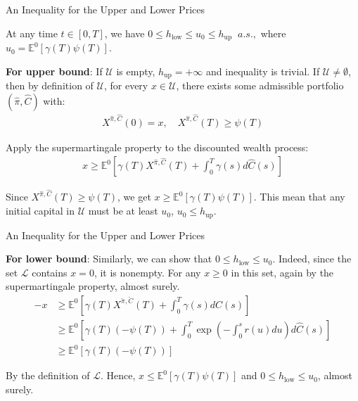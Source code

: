 \documentclass{beamer}
\begin{document}
\begin{frame}{An Inequality for the Upper and Lower Prices}

    {\footnotesize \footnotesize
    \par At any time $t \in [0, T]$, we have $ 0 \leq h_{\text{low}} \leq u_0 \leq h_{\text{up}}\;\; a.s.,$ where $u_0 = \mathbb{E}^0[\gamma(T)\psi(T)]$.
    \vspace{1em}
    \par \textbf{For upper bound}: If $\mathcal{U}$ is empty, $h_{\text{up}} = +\infty$ and inequality is trivial. If $\mathcal{U} \neq \emptyset$, then by definition of $\mathcal{U}$, for every $x \in \mathcal{U}$,
     there exists some admissible portfolio $(\hat{\pi}, \hat{C})$ with:
     \begin{align*}
        X^{\hat{\pi}, \hat{C}}(0) = x, \quad X^{\hat{\pi}, \hat{C}}(T) \geq \psi(T)
     \end{align*}
     \par Apply the supermartingale property to the discounted wealth process:
     \begin{align*}
        x \geq \mathbb{E}^0 \left[ \gamma(T) X^{\hat{\pi}, \hat{C}}(T) + \int_0^T \gamma(s) d\hat{C}(s) \right]
     \end{align*}
     \par Since $X^{\hat{\pi}, \hat{C}}(T) \geq \psi(T)$, we get $ x \geq \mathbb{E}^0 [\gamma(T) \psi(T)]$. 
     This mean that any initial capital in $\mathcal{U}$ must be at least $u_0$, $ u_0 \leq h_{\text{up}}$.
    
    }
\end{frame} 

\begin{frame}{An Inequality for the Upper and Lower Prices}

    {\footnotesize \footnotesize
    \par \textbf{For lower bound}: Similarly, we can show that $0 \leq h_{\text{low}} \leq u_0$. Indeed, since the set $\mathcal{L}$ contains $x = 0$,
     it is nonempty. For any $x \geq 0$ in this set, again by the supermartingale property, almost surely.
     \begin{align*}
        -x &\geq \mathbb{E}^0 \left[ \gamma(T) X^{\check{\pi}, \check{C}}(T) + \int_0^T \gamma(s) d\hat{C}(s) \right] \\
        &\geq \mathbb{E}^0 \left[ \gamma(T) (-\psi(T)) + \int_0^T \exp \left( - \int_0^s r(u) du \right) d\hat{C}(s) \right] \\
        &\geq \mathbb{E}^0 \left[ \gamma(T) (-\psi(T)) \right]
        \end{align*}
        \vspace{1em}
    \par By the definition of $\mathcal{L}$. Hence, $x \leq \mathbb{E}^0 \left[ \gamma(T) \psi(T) \right]$ and $0 \leq h_{\text{low}} \leq u_0$, almost surely.
    

    }
\end{frame} 
\end{document}
